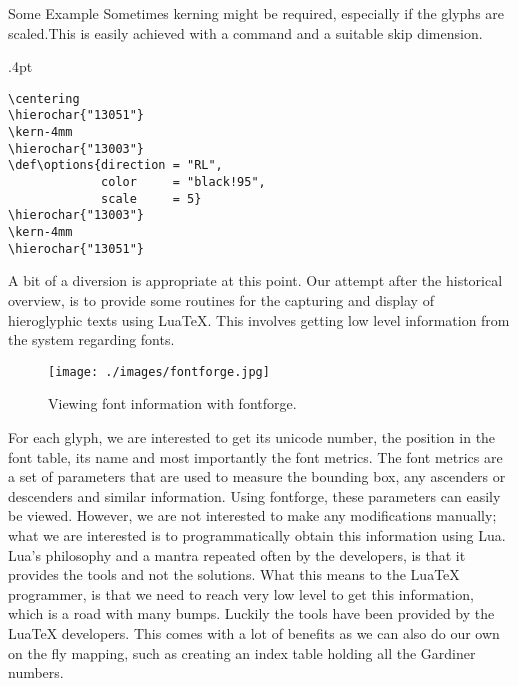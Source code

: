 \begin{scriptexample}[]{Some Example}
Sometimes kerning might be required, especially if the
glyphs are scaled.This is easily achieved with a \cmd{\kern}
command and a suitable skip dimension.

\medskip

\bgroup
\fboxsep=0pt\fboxsep.4pt
\def\options{direction = "RL",
             color     = "black!95",
             scale     = 5}
\centering

\color{teal}
\kern-4mm
\def\options{direction = "LR",
             color     = "black!95",
             scale     = 5}
\color{red}
\kern-4mm
\color{black!95}
\egroup
\begin{verbatim}
\centering
\hierochar{"13051"}
\kern-4mm
\hierochar{"13003"}
\def\options{direction = "RL",
             color     = "black!95",
             scale     = 5}
\hierochar{"13003"}
\kern-4mm
\hierochar{"13051"}
\end{verbatim}
\end{scriptexample}

A bit of a diversion is appropriate at this point. Our attempt after the historical overview, is to provide some routines for the capturing and display of hieroglyphic texts using LuaTeX. This involves getting low level information from the system regarding fonts. 

\begin{figure}[ht]
\begin{minipage}{0.45\textwidth}
\centering
\texttt{[image: ./images/fontforge.jpg]}
\end{minipage}
\begin{minipage}[t]{0.45\textwidth}
\caption{Viewing font information with fontforge.}
\end{minipage}
\end{figure}

For each glyph, we are interested to get its unicode number, the position in the font table, its name and most importantly the font metrics. The font metrics are a set of parameters that are used to measure the bounding box, any ascenders or descenders and similar information. Using fontforge, these parameters can easily be viewed. However, we are not interested to make any modifications manually; what we are interested is to programmatically obtain this information using Lua. Lua's philosophy and a mantra repeated often by the developers, is that it provides the tools and not the solutions. What this means to the LuaTeX programmer, is that we need to reach very low level  to get this information, which is a road with many bumps. Luckily the tools have been provided by the LuaTeX developers. This comes with a lot of benefits as we can also do our own on the fly mapping, such as creating an index table holding all the Gardiner numbers. 


